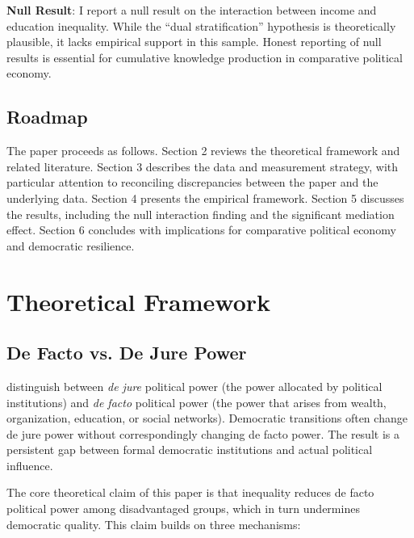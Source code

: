 \documentclass[11pt,letterpaper]{article}
\begin{document}
\textbf{Null Result}: I report a null result on the interaction between income and education inequality. While the ``dual stratification'' hypothesis is theoretically plausible, it lacks empirical support in this sample. Honest reporting of null results is essential for cumulative knowledge production in comparative political economy.

\subsection{Roadmap}

The paper proceeds as follows. Section 2 reviews the theoretical framework and related literature. Section 3 describes the data and measurement strategy, with particular attention to reconciling discrepancies between the paper and the underlying data. Section 4 presents the empirical framework. Section 5 discusses the results, including the null interaction finding and the significant mediation effect. Section 6 concludes with implications for comparative political economy and democratic resilience.

\section{Theoretical Framework}

\subsection{De Facto vs. De Jure Power}

\cite{Acemoglu2008} distinguish between \textit{de jure} political power (the power allocated by political institutions) and \textit{de facto} political power (the power that arises from wealth, organization, education, or social networks). Democratic transitions often change de jure power without correspondingly changing de facto power. The result is a persistent gap between formal democratic institutions and actual political influence.

The core theoretical claim of this paper is that inequality reduces de facto political power among disadvantaged groups, which in turn undermines democratic quality. This claim builds on three mechanisms:
\end{document}
